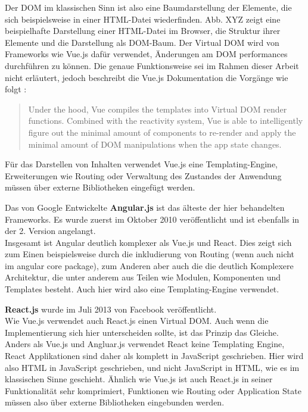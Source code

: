Der DOM im klassischen Sinn ist also eine Baumdarstellung der Elemente, die sich beispielsweise in einer HTML-Datei wiederfinden. Abb. XYZ zeigt eine beispielhafte Darstellung einer HTML-Datei im Browser, die Struktur ihrer Elemente und die Darstellung als DOM-Baum.
Der Virtual DOM wird von Frameworks wie Vue.js dafür verwendet, Änderungen am DOM performances durchführen zu können. Die genaue Funktionsweise sei im Rahmen dieser Arbeit nicht erläutert,  jedoch beschreibt die Vue.js Dokumentation die Vorgänge wie folgt \cite{VueTemplate}:

\begin{quote}
  Under the hood, Vue compiles the templates into Virtual DOM render functions. Combined with the reactivity system, Vue is able to intelligently figure out the minimal amount of components to re-render and apply the minimal amount of DOM manipulations when the app state changes.
\end{quote}

Für das Darstellen von Inhalten verwendet Vue.js eine Templating-Engine, Erweiterungen wie Routing oder Verwaltung des Zustandes der Anwendung müssen über externe Bibliotheken eingefügt werden.

Das von Google Entwickelte \textbf{Angular.js} ist das älteste der hier behandelten Frameworks. Es wurde zuerst im Oktober 2010 veröffentlicht und ist ebenfalls in der 2. Version angelangt.\\
Insgesamt ist Angular deutlich komplexer als  Vue.js und React. Dies zeigt sich zum Einen beispielsweise durch die inkludierung von Routing (wenn auch nicht im angular core package), zum Anderen aber auch die die deutlich Komplexere Architektur, die unter anderem aus Teilen wie Modulen, Komponenten und Templates besteht. Auch hier wird also eine Templating-Engine verwendet.

\textbf{React.js} wurde im Juli 2013 von Facebook veröffentlicht.\\
Wie Vue.js verwendet auch React.js einen Virtual DOM. Auch wenn die Implementierung sich hier unterscheiden sollte, ist das Prinzip das Gleiche.
Anders als Vue.js und Angluar.js verwendet React keine Templating Engine, React Applikationen sind daher als komplett in JavaScript geschrieben. Hier wird also HTML in JavaScript geschrieben, und nicht JavaScript in HTML, wie es im klassischen Sinne geschieht.
Ähnlich wie Vue.js ist auch React.js in seiner Funktionalität sehr komprimiert, Funktionen wie Routing oder Application State müssen also über externe Bibliotheken eingebunden werden.

